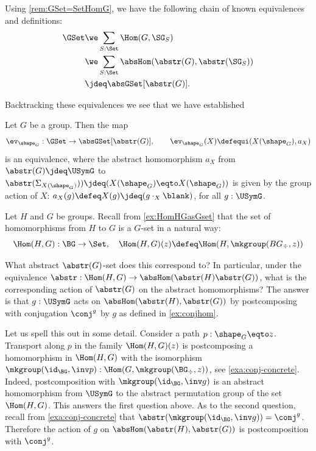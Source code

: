 Using \cref{rem:GSet=SetHomG},
we have the following chain of known equivalences and definitions:
\begin{align*}
\GSet 
&\we \sum_{S:\Set} \Hom(G,\SG_S) \\
&\we\sum_{S:\Set} \absHom(\abstr(G),\abstr(\SG_S)) \\
&\jdeq \absGSet[\abstr(G)].
\end{align*}

Backtracking these equivalences we see that we have established
\begin{lemma}\label{lem:actionsconcr2abstr}
Let $G$ be a group. Then the map
\[
\ev_{\sh_G}:\GSet\to\absGSet[\abstr(G)],\qquad \ev_{\sh_G}(X)
\defequi(X(\sh_G),a_X)
\]
is an equivalence, where the abstract homomorphism $a_X$ from
$\abstr(G)\jdeq\USymG$ to 
$\abstr(\Sigma_{X(\sh_G)})) \jdeq (X(\sh_G)\eqto X(\sh_G))$ is given by
the group action of $X$: $a_X(g) \defeq X(g) \jdeq (g\cdot_X \blank)$,
for all $g:\USymG$.
\end{lemma}

\begin{example}\label{ex:abstrandconj}
Let $H$ and $G$ be groups.  Recall from \cref{ex:HomHGasGset}
that the set of homomorphisms from $H$ to $G$ is a $G$-set in a natural way:
\[
\Hom(H,G):\BG\to\Set,\quad \Hom(H,G)(z)\defeq\Hom(H,\mkgroup(BG_\div,z)) 
\]

What abstract $\abstr(G)$-set does this correspond to?
In particular, under the equivalence 
$\abstr:\Hom(H,G)\to\absHom(\abstr(H)\abstr(G))$, what is the 
corresponding action of $\abstr(G)$ on the abstract homomorphisms?
The answer is that $g:\USymG$ acts on $\absHom(\abstr(H),\abstr(G))$ by
postcomposing with conjugation $\conj^g$ by $g$ as defined in
\cref{ex:conjhom}.

Let us spell this out in some detail. Consider a path $p:\sh_G\eqto z$.
Transport along $p$ in the family $\Hom(H,G)(z)$
is postcomposing a homomorphism in $\Hom(H,G)$ with the
isomorphism $\mkgroup(\id_\BG,\inv p): \Hom(G,\mkgroup(\BG_\div,z))$,
see \cref{exa:conj-concrete}. Indeed, postcomposition with 
$\mkgroup(\id_\BG,\inv g)$ is an abstract homomorphism from 
$\USymG$ to the abstract permutation group of the set $\Hom(H,G)$. 
This answers the first question above. As to the second question,
recall from \cref{exa:conj-concrete}
that $\abstr(\mkgroup(\id_\BG,\inv g)) = \conj^g$. Therefore the action
of $g$ on $\absHom(\abstr(H),\abstr(G))$ is postcomposition with $\conj^g$.
\end{example}

